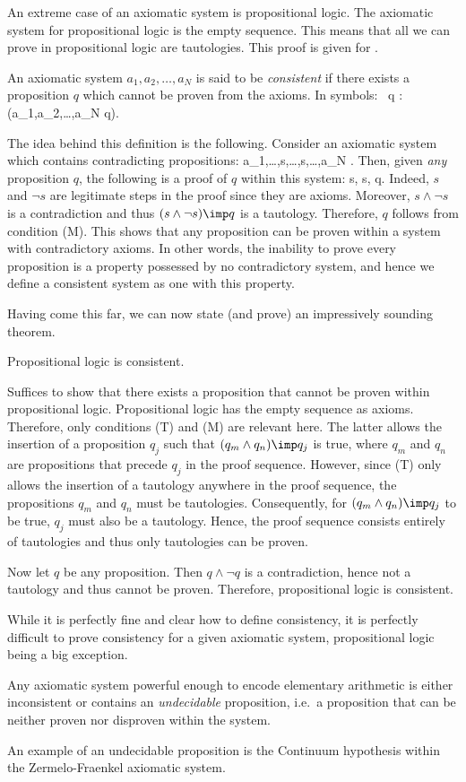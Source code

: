 An extreme case of an axiomatic system is propositional logic.
The axiomatic system for propositional logic is the empty sequence.
This means that all we can prove in propositional logic are tautologies. This
proof is given for .

\bd
An axiomatic system $a_1,a_2,\ldots,a_N$ is said to be \emph{consistent} if there exists a proposition $q$ which cannot be proven from the axioms.
In symbols:
\bse
\exists \, q : \neg (a_1,a_2,\ldots,a_N \vdash q).
\ese
\ed

The idea behind this definition is the following.
Consider an axiomatic system which contains contradicting propositions:
\bse
a_1,\ldots,s,\ldots,\neg s,\ldots,a_N .
\ese
Then, given \emph{any} proposition $q$, the following is a proof of $q$ within this system:
\bse
s, \neg s, q.
\ese
Indeed, $s$ and $\neg s$ are legitimate steps in the proof since they are axioms.
Moreover, $s\land \neg s$ is a contradiction and thus $(s\land \neg s) \imp q$ is a tautology.
Therefore, $q$ follows from condition (M).
This shows that any proposition can be proven within a system with contradictory axioms.
In other words, the inability to prove every proposition is a property possessed by no contradictory system, and hence we define a consistent system as one with this property.

Having come this far, we can now state (and prove) an impressively sounding theorem.

\bt
Propositional logic is consistent. \label{thm:prop_logic_is_consitent}
\et

\bq
Suffices to show that there exists a proposition that cannot be proven within propositional logic. Propositional logic has the empty sequence as axioms.
Therefore, only conditions (T) and (M) are relevant here.
The latter allows the insertion of a proposition $q_j$ such that $(q_m\land q_n) \imp q_j$ is true, where $q_m$ and $q_n$ are propositions that precede $q_j$ in the proof sequence.
However, since (T) only allows the insertion of a tautology anywhere in the proof sequence, the propositions $q_m$ and $q_n$ must be tautologies.
Consequently, for $(q_m\land q_n) \imp q_j$ to be true, $q_j$ must also be a tautology.
Hence, the proof sequence consists entirely of tautologies and thus only tautologies can be proven.

Now let $q$ be any proposition.
Then $q\land \neg q$ is a contradiction, hence not a tautology and thus cannot be proven.
Therefore, propositional logic is consistent.
\eq

\br
While it is perfectly fine and clear how to define consistency, it is perfectly difficult to prove consistency for a given axiomatic system, propositional logic being a big exception.
\er

\bt
Any axiomatic system powerful enough to encode elementary arithmetic is either inconsistent or contains an \emph{undecidable} proposition, i.e.\ a proposition that can be neither proven nor disproven within the system.
\et

An example of an undecidable proposition is the Continuum hypothesis within the Zermelo-Fraenkel axiomatic system.  
